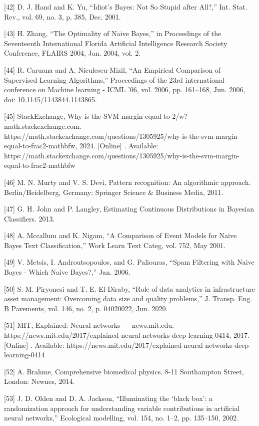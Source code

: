 \documentclass[sn-mathphys-num]{sn-jnl}%
\begin{document}
[42] D. J. Hand and K. Yu, “Idiot’s Bayes: Not So Stupid after All?,” Int. Stat. Rev., vol. 69, no. 3, p. 385, Dec. 2001.

[43] H. Zhang, “The Optimality of Naive Bayes,” in Proceedings of the Seventeenth International Florida Artificial Intelligence Research Society Conference, FLAIRS 2004, Jan. 2004, vol. 2.

[44] R. Caruana and A. Niculescu-Mizil, “An Empirical Comparison of Supervised Learning Algorithms,” Proceedings of the 23rd international conference on Machine learning - ICML ’06, vol. 2006, pp. 161–168, Jun. 2006, doi: 10.1145/1143844.1143865.

[45] StackExchange, Why is the SVM margin equal to 2/w? — math.stackexchange.com. https://math.stackexchange.com/questions/1305925/why-is-the-svm-margin-equal-to-frac2-mathbfw, 2024. [Online] . Available: https://math.stackexchange.com/questions/1305925/why-is-the-svm-margin-equal-to-frac2-mathbfw

[46] M. N. Murty and V. S. Devi, Pattern recognition: An algorithmic approach. Berlin/Heidelberg, Germany: Springer Science & Business Media, 2011.

[47] G. H. John and P. Langley, Estimating Continuous Distributions in Bayesian Classifiers. 2013.

[48] A. Mccallum and K. Nigam, “A Comparison of Event Models for Naive Bayes Text Classification,” Work Learn Text Categ, vol. 752, May 2001.

[49] V. Metsis, I. Androutsopoulos, and G. Paliouras, “Spam Filtering with Naive Bayes - Which Naive Bayes?,” Jan. 2006.

[50] S. M. Piryonesi and T. E. El-Diraby, “Role of data analytics in infrastructure asset management: Overcoming data size and quality problems,” J. Transp. Eng. B Pavements, vol. 146, no. 2, p. 04020022, Jun. 2020.

[51] MIT, Explained: Neural networks — news.mit.edu. https://news.mit.edu/2017/explained-neural-networks-deep-learning-0414, 2017. [Online] . Available: https://news.mit.edu/2017/explained-neural-networks-deep-learning-0414

[52] A. Brahme, Comprehensive biomedical physics. 8-11 Southampton Street, London: Newnes, 2014.

[53] J. D. Olden and D. A. Jackson, “Illuminating the ‘black box’: a randomization approach for understanding variable contributions in artificial neural networks,” Ecological modelling, vol. 154, no. 1–2, pp. 135–150, 2002.
\end{document}
